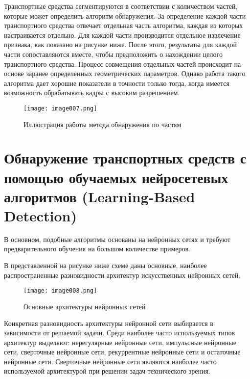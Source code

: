 Транспортные средства сегментируются в соответствии с количеством частей, которые может определить алгоритм обнаружения. За определение каждой части транспортного средства отвечает отдельная часть алгоритма, каждая из которых настраивается отдельно. Для каждой части производится отдельное извлечение признака, как показано на рисунке ниже. После этого, результаты для каждой части сопоставляются вместе, чтобы предположить о нахождении целого транспортного средства. Процесс совмещения отдельных частей происходит на основе заранее определенных геометрических параметров. Однако работа такого алгоритма дает хорошие показатели в точности только тогда, когда имеется возможность обрабатывать кадры с высоким разрешением. 

\begin{figure}[htbp]
\centering
\texttt{[image: image007.png]}
\caption{Иллюстрация работы метода обнаружения по частям~\cite{ten}}%
\label{fig:how-to-do-research}
\end{figure}

\section{Обнаружение транспортных средств с помощью обучаемых нейросетевых алгоритмов (Learning-Based Detection)}

В основном, подобные алгоритмы основаны на нейронных сетях и требуют предварительного обучения на большом количестве примеров.

В представленной на рисунке ниже схеме даны основные, наиболее распространенные разновидности архитектур искусственных нейронных сетей.

\begin{figure}[htbp]
\centering
\texttt{[image: image008.png]}
\caption{Основные архитектуры нейронных сетей}%
\label{fig:how-to-do-research}
\end{figure}

Конкретная разновидность архитектуры нейронной сети выбирается в зависимости от решаемой задачи. Среди наиболее часто используемых типов архитектур выделяют: нерегулярные нейронные сети, импульсные нейронные сети, сверточные нейронные сети, рекуррентные нейронные сети и остаточные нейронные сети. Сверточные нейронные сети являются наиболее часто используемой архитектурой при решении задач технического зрения.


